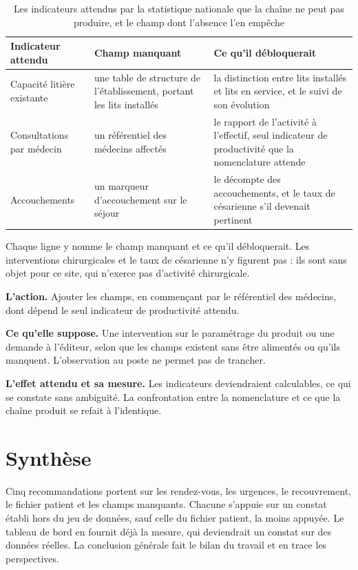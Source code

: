 \begin{table}[htbp]
\centering
\caption[Les indicateurs attendus que la chaîne ne peut pas produire]{Les indicateurs attendus par la statistique nationale que la chaîne ne peut pas produire, et le champ dont l'absence l'en empêche}\label{tab:indicateurs-non-calculables}
\begin{tabular}{@{}p{4.4cm}p{4.6cm}p{5.0cm}@{}}
\toprule
Indicateur attendu & Champ manquant & Ce qu'il débloquerait \\
\midrule
Capacité litière existante & une table de structure de l'établissement, portant les lits installés & la distinction entre lits installés et lits en service, et le suivi de son évolution \\
\addlinespace
Consultations par médecin & un référentiel des médecins affectés & le rapport de l'activité à l'effectif, seul indicateur de productivité que la nomenclature attende \\
\addlinespace
Accouchements & un marqueur d'accouchement sur le séjour & le décompte des accouchements, et le taux de césarienne s'il devenait pertinent \\
\bottomrule
\end{tabular}
\end{table}

Chaque ligne y nomme le champ manquant et ce qu'il débloquerait. Les interventions chirurgicales et
le taux de césarienne n'y figurent pas : ils sont sans objet pour ce site, qui n'exerce pas
d'activité chirurgicale.

\textbf{L'action.} Ajouter les  champs, en commençant par le référentiel des médecins, dont
dépend le seul indicateur de productivité attendu.

\textbf{Ce qu'elle suppose.} Une intervention sur le paramétrage du produit ou une demande à
l'éditeur, selon que les champs existent sans être alimentés ou qu'ils manquent. L'observation au
poste ne permet pas de trancher.

\textbf{L'effet attendu et sa mesure.} Les  indicateurs deviendraient calculables, ce qui se
constate sans ambiguïté. La confrontation entre la nomenclature et ce que la chaîne produit se refait
à l'identique.

\section*{Synthèse}

Cinq recommandations portent sur les rendez-vous, les urgences, le recouvrement, le fichier patient
et les champs manquants. Chacune s'appuie sur un constat établi hors du jeu de données, sauf celle du
fichier patient, la moins appuyée. Le tableau de bord en fournit déjà la mesure, qui deviendrait un
constat sur des données réelles. La conclusion générale fait le bilan du travail et en trace les
perspectives.
